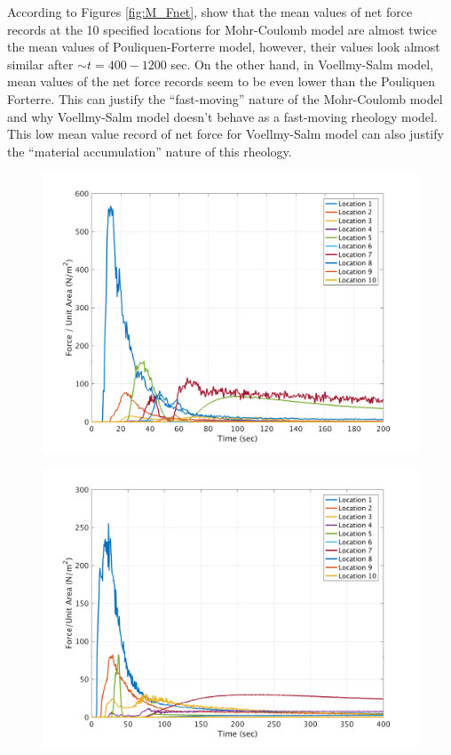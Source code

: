 \documentclass[a4paper,10pt]{article}
\begin{document}
\newpage
According to Figures \ref{fig:M_Fnet}, show that the mean values of net force records at the 10 specified locations for Mohr-Coulomb model are almost twice the mean values of Pouliquen-Forterre model, however, their values look almost similar after $\sim t=400-1200$ sec. On the other hand, in Voellmy-Salm model, mean values of the net force records seem to be even lower than the Pouliquen Forterre. This can justify the ``fast-moving'' nature of the Mohr-Coulomb model and why Voellmy-Salm model doesn't behave as a fast-moving rheology model. This low mean value record of net force for Voellmy-Salm model can also justify the ``material accumulation'' nature of this rheology.
\begin{figure}[H]

	\begin{minipage}[b]{0.5\linewidth}
	\centering
    \includegraphics[width=1\textwidth]{MeansAll/FintC_all.png}     
        \label{fig:M_FintCall}
	\end{minipage}
	\begin{minipage}[b]{0.5\linewidth}
	\centering
    \includegraphics[width=1\textwidth]{MeansAll/FpressP_all.png}
        \label{fig:M_FpressPall}
	\end{minipage}
	

\end{figure}
\end{document}
